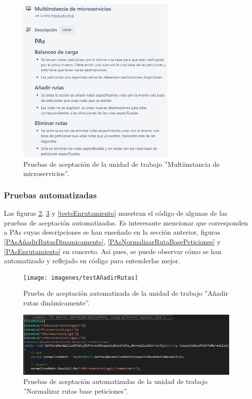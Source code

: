 \documentclass[11pt,spanish,listoffigures]{tfgetsinf}
\begin{document}
\begin{figure}[ht]
\centering
\includegraphics[width=0.7\textwidth]{imagenes/PAsMultiinstanciaDeMicroservicios}
\caption{Pruebas de aceptación de la unidad de trabajo ''Multiinstancia de microservicios''.}
	\label{PAsMultiinstanciaDeMicroservicios}
\end{figure}


			\subsubsection{Pruebas automatizadas}

Las figuras \ref{testAñadirRutas}, \ref{testGetYarpNormalizedRequestsBasePath} y \ref{testsEnrutamiento} muestran el código de algunas de las pruebas de aceptación automatizadas. Es interesante mencionar que corresponden a PAs cuyas descripciones se han enseñado en la sección anterior, figuras \ref{PAsAñadirRutasDinamicamente}, \ref{PAsNormalizarRutaBasePeticiones} y \ref{PAsEnrutamiento} en concreto. Así pues, se puede observar cómo se han automatizado y reflejado en código para entenderlas mejor.

\begin{figure}[ht]
\centering
\texttt{[image: imagenes/testAñadirRutas]}
\caption{Prueba de aceptación automatizada de la unidad de trabajo ''Añadir rutas dinámicamente''.}
	\label{testAñadirRutas}
\end{figure}

\begin{figure}[ht]
\centering
\includegraphics[width=1\textwidth]{imagenes/testGetYarpNormalizedRequestsBasePath}
\caption{Pruebas de aceptación automatizadas de la unidad de trabajo ''Normalizar rutas base peticiones''.}
	\label{testGetYarpNormalizedRequestsBasePath}
\end{figure}
\end{document}
